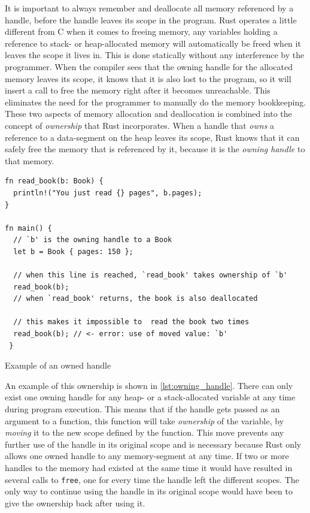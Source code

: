 It is important to always remember and deallocate all memory referenced by a handle, before the handle leaves its scope in the program.
Rust operates a little different from C when it comes to freeing memory, any variables holding a reference to stack- or heap-allocated memory will automatically be freed when it leaves the scope it lives in.
This is done statically without any interference by the programmer.
When the compiler sees that the owning handle for the allocated memory leaves its scope, it knows that it is also lost to the program, so it will insert a call to free the memory right after it becomes unreachable.
This eliminates the need for the programmer to manually do the memory bookkeeping.
These two aspects of memory allocation and deallocation is combined into the concept of \emph{ownership} that Rust incorporates.
When a handle that \emph{owns} a reference to a data-segment on the heap leaves its scope, Rust knows that it can safely free the memory that is referenced by it, because it is the \emph{owning handle} to that memory.

\begin{listing}[tb]
\begin{verbatim}
fn read_book(b: Book) {
  println!("You just read {} pages", b.pages);
}

fn main() {
  // `b' is the owning handle to a Book
  let b = Book { pages: 150 };

  // when this line is reached, `read_book' takes ownership of `b'
  read_book(b);
  // when `read_book' returns, the book is also deallocated

  // this makes it impossible to  read the book two times
  read_book(b); // <- error: use of moved value: `b'
 }
\end{verbatim}
\caption{Example of an owned handle}
\label{lst:owning_handle}
\end{listing}

An example of this ownership is shown in \autoref{lst:owning_handle}.
There can only exist one owning handle for any heap- or a stack-allocated variable at any time during program execution.
This means that if the handle gets passed as an argument to a function, this function will take \emph{ownership} of the variable, by \emph{moving} it to the new scope defined by the function.
This move prevents any further use of the handle in its original scope and is necessary because Rust only allows one owned handle to any memory-segment at any time.
If two or more handles to the memory had existed at the same time it would have resulted in several calls to \texttt{free}, one for every time the handle left the different scopes.
The only way to continue using the handle in its original scope would have been to give the ownership back after using it.


